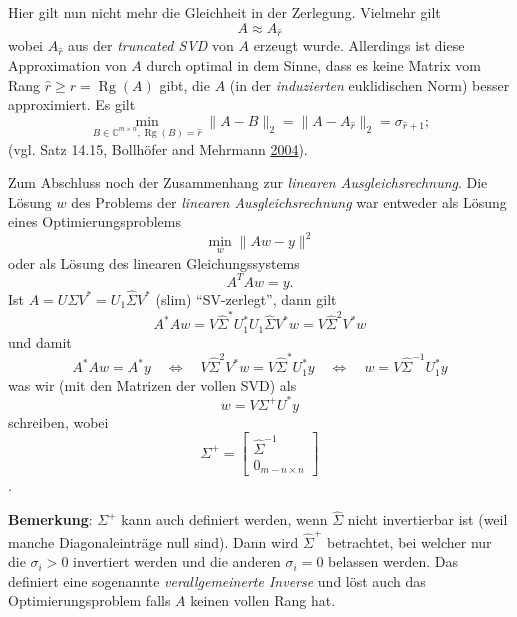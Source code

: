 \documentclass[
]{book}
\theoremstyle{definition}
\theoremstyle{definition}
\theoremstyle{definition}
\theoremstyle{definition}
\theoremstyle{remark}
\begin{document}
Hier gilt nun nicht mehr die Gleichheit in der Zerlegung. Vielmehr gilt
\begin{equation*}
A \approx A_{\hat r}
\end{equation*}
wobei \(A_{\hat r}\) aus der \emph{truncated SVD} von \(A\) erzeugt wurde. Allerdings ist diese Approximation von \(A\) durch optimal in dem Sinne, dass es keine Matrix vom Rang \(\hat r \geq r=\operatorname{Rg}(A)\) gibt, die \(A\) (in der \emph{induzierten} euklidischen Norm) besser approximiert. Es gilt
\begin{equation*}
\min_{B\in \mathbb C^{m\times n}, \operatorname{Rg}(B)=\hat r} \|A-B\|_2 = \|A-A_{\hat r}\|_2 = \sigma_{\hat r + 1};
\end{equation*}
(vgl. Satz 14.15, Bollhöfer and Mehrmann \protect\hyperlink{ref-BolM04}{2004}).

Zum Abschluss noch der Zusammenhang zur \emph{linearen Ausgleichsrechnung}.
Die Lösung \(w\) des Problems der \emph{linearen Ausgleichsrechnung} war entweder als Lösung eines Optimierungsproblems
\begin{equation*}
\min_{w} \| Aw - y \|^2
\end{equation*}
oder als Lösung des linearen Gleichungssystems
\begin{equation*}
A^TAw=y.
\end{equation*}
Ist \(A=U\Sigma V^*=U_1\hat \Sigma V^*\) (slim) ``SV-zerlegt'', dann gilt
\begin{equation*}
A^*Aw = V\hat \Sigma^*U_1^*U_1\hat \Sigma V^*w = V\hat \Sigma^2 V^* w
\end{equation*}
und damit
\begin{equation*}
A^*Aw = A^*y \quad \Leftrightarrow \quad V\hat \Sigma^2 V^*w  = V\hat \Sigma^*U_1^*y \quad \Leftrightarrow \quad w = V\hat \Sigma^{-1} U_1^*y
\end{equation*}
was wir (mit den Matrizen der vollen SVD) als
\begin{equation*}
w = V \Sigma^+ U^*y
\end{equation*}
schreiben, wobei
\begin{equation*}
\Sigma^+ = \begin{bmatrix}
\hat \Sigma^{-1} \\ 0_{m-n \times n}
\end{bmatrix}
\end{equation*}
.

\textbf{Bemerkung}: \(\Sigma^+\) kann auch definiert werden, wenn \(\hat \Sigma\) nicht invertierbar ist (weil manche Diagonaleinträge null sind). Dann wird \(\hat \Sigma^+\) betrachtet, bei welcher nur die \(\sigma_i>0\) invertiert werden und die anderen \(\sigma_i=0\) belassen werden. Das definiert eine sogenannte \emph{verallgemeinerte Inverse} und löst auch das Optimierungsproblem falls \(A\) keinen vollen Rang hat.
\end{document}
